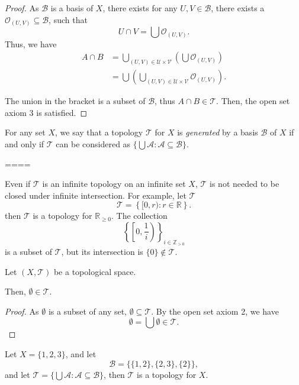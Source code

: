 \documentclass{report}
\begin{document}
\begin{lemma}
\begin{proof}
		As $\mathcal B$ is a basis of $X$, there exists for any $U, V \in \mathcal B$, there exists a $\mathcal O_{(U,V)} \subseteq \mathcal B$, such that
		$$
		U \cap V = \bigcup \mathcal O_{(U, V)}.
		$$
		Thus, we have
		$$
		\begin{aligned}
			A \cap B &= \bigcup_{(U, V) \in \mathcal U \times \mathcal V} \left( \bigcup \mathcal O_{(U, V)} \right) \\
			&= \bigcup \left( \bigcup_{(U, V) \in \mathcal U \times \mathcal V} \mathcal O_{(U, V)} \right).
		\end{aligned}
		$$
		
		The union in the bracket is a subset of $\mathcal B$, thus $A \cap B \in \mathcal T$. Then, the open set axiom 3 is satisfied.
	\end{proof}
\end{lemma}

For any set $X$, we say that a topology $\mathcal T$ for $X$ is \textit{generated} by a basis $\mathcal B$ of $X$ if and only if $\mathcal T$ can be considered as $\{\bigcup \mathcal A: \mathcal A \subseteq \mathcal B\}$.


====


Even if $\mathcal T$ is an infinite	topology on an infinite set $X$, $\mathcal T$ is not needed to be closed under infinite intersection. For example, let $\mathcal T$
$$
\mathcal T = \left\{ [0,r): r \in \mathbb R \right\}.
$$
then $\mathcal T$ is a topology for $\mathbb R_{\ge 0}$. The collection
$$
\left\{ \left[ 0, \frac{1}{i} \right) \right\}_{i \in \mathbb Z_{> 0}}
$$
is a subset of $\mathcal T$, but its intersection is $\{0\} \notin \mathcal T$.



\begin{lemma}
	\label{lm: emptyset is in topology}
	
	Let $(X, \mathcal T)$ be a topological space.
	
	Then, $\emptyset \in \mathcal T$.
\end{lemma}


\begin{proof}
	As $\emptyset$ is a subset of any set, $\emptyset \subseteq \mathcal T$. By the open set axiom 2, we have
	$$
	\emptyset = \bigcup \emptyset \in \mathcal T.
	$$
\end{proof}


\begin{example}
	Let $X = \{1, 2, 3\}$, and let
	$$
	\mathcal B = \{\{1,2\}, \{2, 3\}, \{2\}\},
	$$
	and let $\mathcal T = \{\bigcup \mathcal A: \mathcal A \subseteq \mathcal B\}$, then $\mathcal T$ is a topology for $X$.
\end{example}
\end{document}
